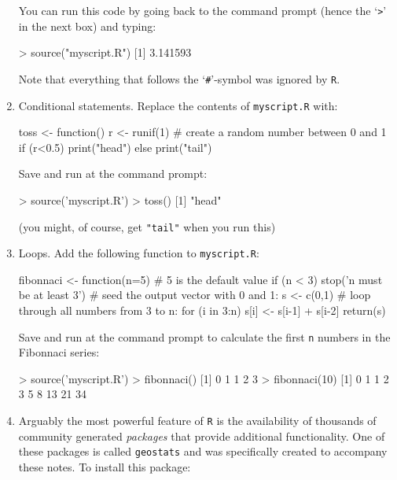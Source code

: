 \begin{enumerate}
You can run this code by going back to the command prompt (hence the
`\verb|>|' in the next box) and typing:

\begin{console}
> source("myscript.R")
[1] 3.141593
\end{console}

Note that everything that follows the `\verb|#|'-symbol was ignored by
\texttt{R}.

\item Conditional statements. Replace the contents of
  \texttt{myscript.R} with:

\begin{script}
toss <- function(){
    r <- runif(1) # create a random number between 0 and 1
    if (r<0.5){
        print("head")
    } else {
        print("tail")
    }
}
\end{script}

Save and run at the command prompt:

\begin{console}
> source('myscript.R')
> toss()
[1] "head"
\end{console}

(you might, of course, get \texttt{"tail"} when you run this)

\item Loops. Add the following function to \texttt{myscript.R}:

\begin{script}[firstnumber=8]
fibonnaci <- function(n=5){ # 5 is the default value
    if (n < 3) { stop('n must be at least 3') }
    # seed the output vector with 0 and 1:
    s <- c(0,1)
    # loop through all numbers from 3 to n:
    for (i in 3:n){
        s[i] <- s[i-1] + s[i-2]
    }
    return(s)
}
\end{script}

Save and run at the command prompt to calculate the first \texttt{n}
numbers in the Fibonnaci series:

\begin{console}
> source('myscript.R')
> fibonnaci()
 [1] 0 1 1 2 3
> fibonnaci(10)
 [1]  0  1  1  2  3  5  8 13 21 34
\end{console}

\item\label{it:geostats} Arguably the most powerful feature of
  \texttt{R} is the availability of thousands of community generated
  \textit{packages} that provide additional functionality. One of
  these packages is called \texttt{geostats} and was specifically
  created to accompany these notes.  To install this package:


\end{enumerate}
